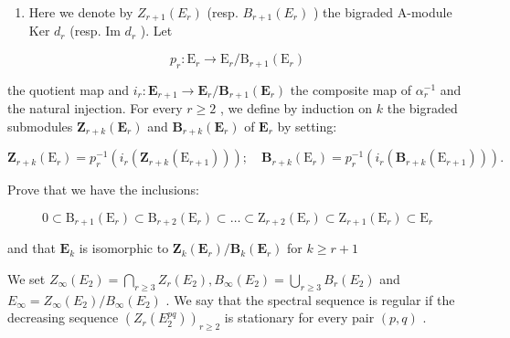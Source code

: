 \begin{enumerate}
\def\labelenumi{\alph{enumi})}
\tightlist
\item
  Here we denote by \(Z_{r+1}(E_r)\) (resp. \(B_{r+1}(E_r)\) ) the bigraded A-module Ker \(d_r\) (resp. Im \(d_r\) ). Let
\end{enumerate}

\[
p _ {r}: \mathrm{E} _ {r} \rightarrow \mathrm{E} _ {r} / \mathrm{B} _ {r + 1} (\mathrm{E} _ {r})
\]

the quotient map and \(i_{r}: \mathbf{E}_{r+1} \to \mathbf{E}_{r}/\mathbf{B}_{r+1}(\mathbf{E}_{r})\) the composite map of \(\alpha_{r}^{-1}\) and the natural injection. For every \(r \geqslant 2\) , we define by induction on \(k\) the bigraded submodules \(\mathbf{Z}_{r+k}(\mathbf{E}_{r})\) and \(\mathbf{B}_{r+k}(\mathbf{E}_{r})\) of \(\mathbf{E}_{r}\) by setting:

\[
\mathbf {Z} _ {r + k} (\mathrm{E} _ {r}) = p _ {r} ^ {- 1} \left(i _ {r} \left(\mathbf {Z} _ {r + k} (\mathrm{E} _ {r + 1})\right)\right); \quad \mathbf {B} _ {r + k} (\mathrm{E} _ {r}) = p _ {r} ^ {- 1} \left(i _ {r} \left(\mathbf {B} _ {r + k} (\mathrm{E} _ {r + 1})\right)\right).
\]

Prove that we have the inclusions:

\[
0 \subset \mathrm{B} _ {r + 1} (\mathrm{E} _ {r}) \subset \mathrm{B} _ {r + 2} (\mathrm{E} _ {r}) \subset \dots \subset \mathrm{Z} _ {r + 2} (\mathrm{E} _ {r}) \subset \mathrm{Z} _ {r + 1} (\mathrm{E} _ {r}) \subset \mathrm{E} _ {r}
\]

and that \(\mathbf{E}_k\) is isomorphic to \(\mathbf{Z}_k(\mathbf{E}_r) / \mathbf{B}_k(\mathbf{E}_r)\) for \(k\geqslant r + 1\)

We set \(Z_{\infty}(E_2) = \bigcap_{r \geqslant 3} Z_r(E_2), B_{\infty}(E_2) = \bigcup_{r \geqslant 3} B_r(E_2)\) and \(E_{\infty} = Z_{\infty}(E_2)/B_{\infty}(E_2)\) . We say that the spectral sequence is regular if the decreasing sequence \((Z_r(E_2^{pq}))_{r \geqslant 2}\) is stationary for every pair \((p, q)\) .

